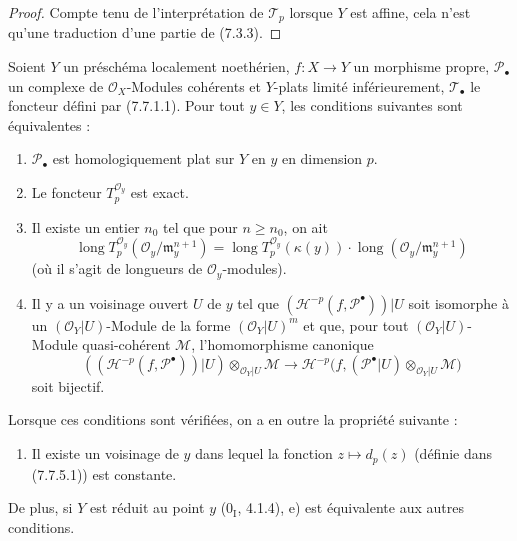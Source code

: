 \begin{proof}
Compte tenu de l'interprétation de $\mathscr T_p$ lorsque $Y$ est affine, cela
n'est qu'une traduction d'une partie de (7.3.3).
\end{proof}

\begin{proposition}[7.8.4]
Soient $Y$ un préschéma localement noethérien, $f:X\to Y$ un morphisme propre,
$\mathscr P_\bullet$ un complexe de $\mathscr O_X$-Modules cohérents et $Y$-plats
limité inférieurement, $\mathscr T_\bullet$ le foncteur défini par (7.7.1.1).
Pour tout $y\in Y$, les conditions suivantes sont équivalentes :
\begin{enumerate}
  \item[a)] $\mathscr P_\bullet$ est homologiquement plat sur $Y$ en $y$ en
    dimension $p$.
  \item[b)] Le foncteur $T_p^{\mathscr O_y}$ est exact.
  \item[c)] Il existe un entier $n_0$ tel que pour $n\geq n_0$, on ait
    \[
      \operatorname{long}T_p^{\mathscr O_y}
        (\mathscr O_y/\mathfrak m_y^{n+1})
      =
      \operatorname{long}T_p^{\mathscr O_y}(\kappa(y))
      \cdot
      \operatorname{long}(\mathscr O_y/\mathfrak m_y^{n+1})
      \tag{7.8.4.1}\label{III.7.8.4.1.fr}
    \]
    (où il s'agit de longueurs de $\mathscr O_y$-modules).
  \item[d)] Il y a un voisinage ouvert $U$ de $y$ tel que
    $(\mathscr H^{-p}(f,\mathscr P^\bullet))|U$ soit isomorphe à un
    $(\mathscr O_Y|U)$-Module de la forme $(\mathscr O_Y|U)^m$ et que, pour tout
    $(\mathscr O_Y|U)$-Module quasi-cohérent $\mathscr M$, l'homomorphisme
    canonique
    \[
      ((\mathscr H^{-p}(f,\mathscr P^\bullet))|U)
      \otimes_{\mathscr O_Y|U}\mathscr M
      \longrightarrow
      \mathscr H^{-p}
      \bigl(
        f,(\mathscr P^\bullet|U)
          \otimes_{\mathscr O_Y|U}\mathscr M
      \bigr)
      \tag{7.8.4.2}\label{III.7.8.4.2.fr}
    \]
    soit bijectif.
\end{enumerate}
Lorsque ces conditions sont vérifiées, on a en outre la propriété suivante :
\begin{enumerate}
  \item[e)] Il existe un voisinage de $y$ dans lequel la fonction
    $z\mapsto d_p(z)$ (définie dans (7.7.5.1)) est constante.
\end{enumerate}
De plus, si $Y$ est réduit au point $y$ ($0_{\mathrm I}$, 4.1.4), e) est
équivalente aux autres conditions.
\end{proposition}

